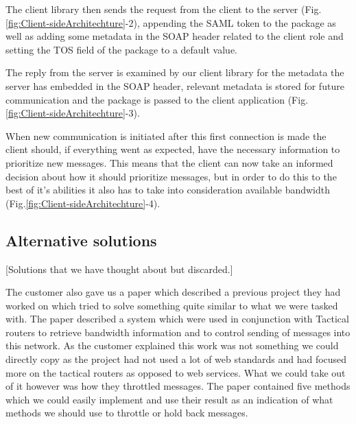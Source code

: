         The client library then sends the request from the client to the server (Fig.\ref{fig:Client-sideArchitechture}-2), appending the SAML token to the package as well as adding some metadata in the SOAP header related to the client role and setting the TOS field of the package to a default value.

        The reply from the server is examined by our client library for the metadata the server has embedded in the SOAP header, relevant metadata is stored for future communication and the package is passed to the client application (Fig.\ref{fig:Client-sideArchitechture}-3).

        When new communication is initiated after this first connection is made the client should, if everything went as expected, have the necessary information to prioritize new messages. This means that the client can now take an informed decision about how it should prioritize messages, but in order to do this to the best of it’s abilities it also has to take into consideration available bandwidth (Fig.\ref{fig:Client-sideArchitechture}-4).
    
           
    \subsection{Alternative solutions}\label{Alternative solutions} [Solutions that we have thought about but discarded.]

        The customer also gave us a paper\cite{soa-qos-pdf} which described a previous project they had worked on which tried to solve something quite similar to what we were tasked with. The paper described a system which were used in conjunction with Tactical routers to retrieve bandwidth information and to control sending of messages into this network. As the customer explained this work was not something we could directly copy as the project had not used a lot of web standards and had focused more on the tactical routers as opposed to web services. What we could take out of it however was how they throttled messages. The paper contained five methods which we could easily implement and use their result as an indication of what methods we should use to throttle or hold back messages.

